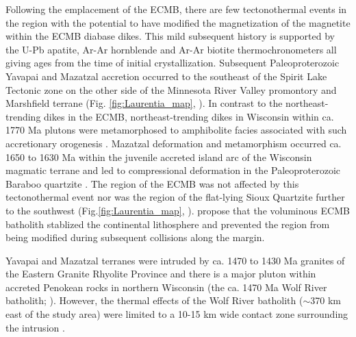 \documentclass[draft]{agujournal2019}
\begin{document}
Following the emplacement of the ECMB, there are few tectonothermal events in the region with the potential to have modified the magnetization of the magnetite within the ECMB diabase dikes. This mild subsequent history is supported by the U-Pb apatite, Ar-Ar hornblende and Ar-Ar biotite thermochronometers all giving ages from the time of initial crystallization. Subsequent Paleoproterozoic Yavapai and Mazatzal accretion occurred to the southeast of the Spirit Lake Tectonic zone on the other side of the Minnesota River Valley promontory and Marshfield terrane (Fig. \ref{fig:Laurentia_map}, ). In contrast to the northeast-trending dikes in the ECMB, northeast-trending dikes in Wisconsin within ca. 1770 Ma plutons were metamorphosed to amphibolite facies associated with such accretionary orogenesis \cite{Holm1998b}. Mazatzal deformation and metamorphism occurred ca. 1650 to 1630 Ma within the juvenile accreted island arc of the Wisconsin magmatic terrane and led to compressional deformation in the Paleoproterozoic Baraboo quartzite \cite{Holm1998c}. The region of the ECMB was not affected by this tectonothermal event nor was the region of the flat-lying Sioux Quartzite further to the southwest (Fig.\ref{fig:Laurentia_map}, ).  propose that the voluminous ECMB batholith stablized the continental lithosphere and prevented the region from being modified during subsequent collisions along the margin.

Yavapai and Mazatzal terranes were intruded by ca. 1470 to 1430 Ma granites of the Eastern Granite Rhyolite Province and there is a major pluton within accreted Penokean rocks in northern Wisconsin (the ca. 1470 Ma Wolf River batholith; \cite{Dewane2007a}). However, the thermal effects of the Wolf River batholith ($\sim$370 km east of the study area) were limited to a 10-15 km wide contact zone surrounding the intrusion \cite{Holm2019a}. 

\end{document}
